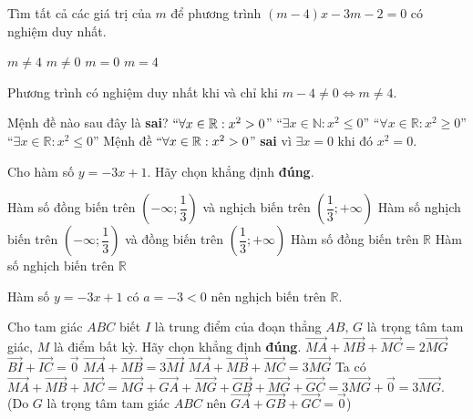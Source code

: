 \begin{ex}%
Tìm tất cả các giá trị của  $m$  để phương trình $\left( m-4 \right)x-3m-2=0$ có nghiệm duy nhất.

\choice
{\True  $m\ne 4$}
{ $m\ne 0$}
{ $m = 0$}
{ $m=4$}

	\loigiai
	{
	Phương trình có nghiệm duy nhất khi và chỉ khi $ m-4 \ne 0 \Leftrightarrow m \ne 4.  $
	}
\end{ex}
\begin{ex}%
Mệnh đề nào sau đây là \textbf{sai}?
\choice
{\True $``\forall x\in \mathbb{R}:x^2>0$''}
{``$\exists x\in \mathbb{N}:x^2 \le 0$''}
{``$\forall x\in \mathbb{R}:x^2 \ge 0$''}
{``$\exists x\in \mathbb{R}:x^2\le 0$''}
	\loigiai
	{
Mệnh đề $``\forall x\in \mathbb{R}:x^2>0$'' \textbf{sai} vì $ \exists x = 0 $ khi đó $ x^2 = 0. $
	}
\end{ex}
\begin{ex}%
	Cho hàm số  $y=-3x+1.$  Hãy chọn khẳng định \textbf{đúng}.
	
	\choice
	{Hàm số đồng biến trên  $\left( -\infty ;\dfrac{1}{3} \right)$  và nghịch biến trên  $\left( \dfrac{1}{3};+\infty  \right)$ 
	}
	{Hàm số nghịch biến trên  $\left( -\infty ;\dfrac{1}{3} \right)$  và đồng biến trên  $\left( \dfrac{1}{3};+\infty  \right)$ 
	}
	{Hàm số đồng biến trên  $\mathbb{R}$ }
	{\True Hàm số nghịch biến trên  $\mathbb{R}$ }
		
	\loigiai
	{
Hàm số 	$y=-3x+1$ có $ a = -3 < 0 $ nên nghịch biến trên $ \mathbb{R}. $
	}
\end{ex}
\begin{ex}%
Cho tam giác $ABC$ biết $I$ là trung điểm của đoạn thẳng $AB,\,G$ là trọng tâm tam giác, $M$ là điểm bất kỳ. Hãy chọn khẳng định \textbf{đúng}.
\choice
{$\overrightarrow{MA}+\overrightarrow{MB}+\overrightarrow{MC}=2\overrightarrow{MG}$}
{$\overrightarrow{BI}+\overrightarrow{IC}=\overrightarrow{0}$}
{$\overrightarrow{MA}+\overrightarrow{MB}=3\overrightarrow{MI}$}
{\True $\overrightarrow{MA}+\overrightarrow{MB}+\overrightarrow{MC}=3\overrightarrow{MG}$}
\loigiai
	{
Ta có $ \vec{MA}+\vec{MB}+\vec{MC} = \vec{MG}+\vec{GA} + \vec{MG}+\vec{GB} +\vec{MG}+\vec{GC} = 3\vec{MG}+\vec{0}=3\vec{MG}. $ \\(Do $ G $ là trọng tâm tam giác $ ABC $ nên $ \vec{GA} +\vec{GB} +\vec{GC} =\vec{0} $)
	}
\end{ex}
